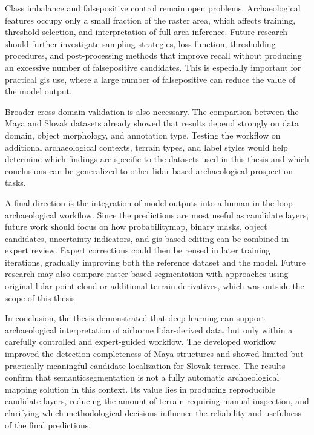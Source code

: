 Class imbalance and \gls{falsepositive} control remain open problems. Archaeological features occupy only a small fraction of the raster area, which affects training, threshold selection, and interpretation of full-area inference. Future research should further investigate sampling strategies, loss function, thresholding procedures, and post-processing methods that improve recall without producing an excessive number of \gls{falsepositive} candidates. This is especially important for practical \gls{gis} use, where a large number of \gls{falsepositive} can reduce the value of the model output.

Broader cross-domain validation is also necessary. The comparison between the Maya and Slovak datasets already showed that results depend strongly on data domain, object morphology, and annotation type. Testing the workflow on additional archaeological contexts, terrain types, and label styles would help determine which findings are specific to the datasets used in this thesis and which conclusions can be generalized to other \gls{lidar}-based archaeological prospection tasks.

A final direction is the integration of model outputs into a human-in-the-loop archaeological workflow. Since the predictions are most useful as candidate layers, future work should focus on how \gls{probabilitymap}, binary masks, object candidates, uncertainty indicators, and \gls{gis}-based editing can be combined in expert review. Expert corrections could then be reused in later training iterations, gradually improving both the reference dataset and the model. Future research may also compare raster-based segmentation with approaches using original \gls{lidar} point cloud or additional terrain derivatives, which was outside the scope of this thesis.

In conclusion, the thesis demonstrated that deep learning can support archaeological interpretation of airborne \gls{lidar}-derived data, but only within a carefully controlled and expert-guided workflow. The developed workflow improved the detection completeness of Maya structures and showed limited but practically meaningful candidate localization for Slovak terrace. The results confirm that \gls{semanticsegmentation} is not a fully automatic archaeological mapping solution in this context. Its value lies in producing reproducible candidate layers, reducing the amount of terrain requiring manual inspection, and clarifying which methodological decisions influence the reliability and usefulness of the final predictions.